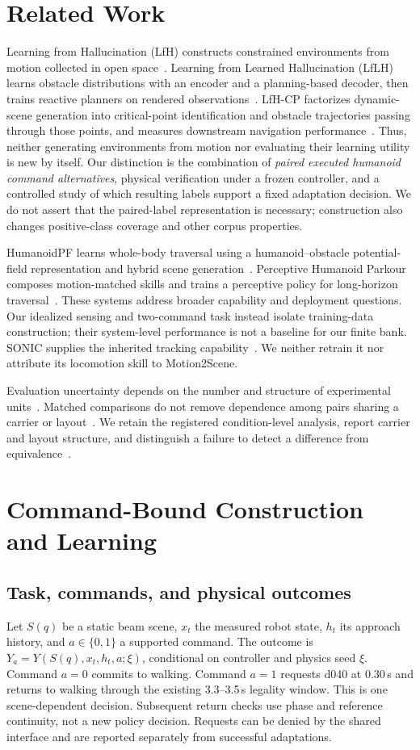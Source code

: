 \documentclass[letterpaper,10pt,conference]{ieeeconf}
\begin{document}
\section{Related Work}
Learning from Hallucination (LfH) constructs constrained environments from motion
collected in open space~\cite{lfh}. Learning from Learned Hallucination (LfLH)
learns obstacle distributions with an encoder and a planning-based decoder,
then trains reactive planners on rendered observations~\cite{lflh}.
LfH-CP factorizes dynamic-scene generation into critical-point identification
and obstacle trajectories passing through those points, and measures downstream
navigation performance~\cite{lfhcp}. Thus, neither generating environments from
motion nor evaluating their learning utility is new by itself. Our distinction
is the combination of \emph{paired executed humanoid command alternatives},
physical verification under a frozen controller, and a controlled study of
which resulting labels support a fixed adaptation decision. We do not assert
that the paired-label representation is necessary; construction also changes
positive-class coverage and other corpus properties.

HumanoidPF learns whole-body traversal using a humanoid--obstacle potential-field
representation and hybrid scene generation~\cite{humanoidpf}. Perceptive Humanoid
Parkour composes motion-matched skills and trains a perceptive policy for
long-horizon traversal~\cite{php}. These systems address broader capability and
deployment questions. Our idealized sensing and two-command task instead isolate
training-data construction; their system-level performance is not a baseline
for our finite bank. SONIC supplies the inherited tracking capability~\cite{sonic}.
We neither retrain it nor attribute its locomotion skill to Motion2Scene.

Evaluation uncertainty depends on the number and structure of experimental
units~\cite{agarwal}. Matched comparisons do not remove dependence among pairs
sharing a carrier or layout~\cite{eliasziw}. We retain the registered
condition-level analysis, report carrier and layout structure, and distinguish
a failure to detect a difference from equivalence~\cite{lakens}.

\section{Command-Bound Construction and Learning}
\subsection{Task, commands, and physical outcomes}
Let $S(q)$ be a static beam scene, $x_t$ the measured robot state, $h_t$ its
approach history, and $a\in\{0,1\}$ a supported command. The outcome is
$Y_a=Y(S(q),x_t,h_t,a;\xi)$, conditional on controller and physics seed $\xi$.
Command $a=0$ commits to walking. Command $a=1$ requests d040 at 0.30\,s and
returns to walking through the existing 3.3--3.5\,s legality window. This is one
scene-dependent decision. Subsequent return checks use phase and reference
continuity, not a new policy decision. Requests can be denied by the shared
interface and are reported separately from successful adaptations.
\end{document}
